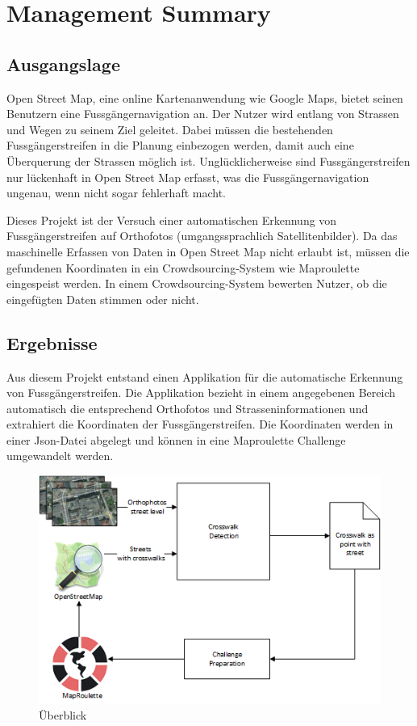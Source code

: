 \section{Management Summary}
\subsection*{Ausgangslage}
Open Street Map, eine online Kartenanwendung wie Google Maps, bietet seinen Benutzern eine Fussgängernavigation an. Der Nutzer wird entlang von Strassen und Wegen zu seinem Ziel geleitet. Dabei müssen die bestehenden Fussgängerstreifen in die Planung einbezogen werden, damit auch eine Überquerung der Strassen möglich ist. Unglücklicherweise sind Fussgängerstreifen nur lückenhaft in Open Street Map erfasst, was die Fussgängernavigation ungenau, wenn nicht sogar fehlerhaft macht.

Dieses Projekt ist der Versuch einer automatischen Erkennung von Fussgängerstreifen auf Orthofotos (umgangssprachlich Satellitenbilder). Da das maschinelle Erfassen von Daten in Open Street Map nicht erlaubt ist, müssen die gefundenen Koordinaten in ein Crowdsourcing-System wie Maproulette eingespeist werden. In einem Crowdsourcing-System bewerten Nutzer, ob die eingefügten Daten stimmen oder nicht.

\subsection*{Ergebnisse}
Aus diesem Projekt entstand einen Applikation für die automatische Erkennung von Fussgängerstreifen. Die Applikation bezieht in einem angegebenen Bereich automatisch die entsprechend Orthofotos und Strasseninformationen und extrahiert die Koordinaten der Fussgängerstreifen. Die Koordinaten werden in einer Json-Datei abgelegt und können in eine Maproulette Challenge umgewandelt werden. 
\\
\begin{figure}[H]
	\centering
	\includegraphics[]{images/management_summary_1.png}
	\caption[Management Summery Überblick]{Überblick}
\end{figure}

